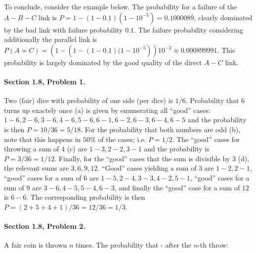 To conclude, consider the example below. The probability for a failure of the $A-B-C$ link is $P = 1 - (1-0.1)(1-10^{-5}) = 0.100008\bar{9}$, clearly dominated by the bad link with failure probability $0.1$. The failure probability considering additionally the parallel link is $P(A \not\sim C) = \left(1 - \left(1 - (1-0.1)(1-10^{-5}\right)\right)10^{-3}\approx 0.000899991$. This probability is largely dominated by the good quality of the direct $A-C$ link.

\vspace{0.5cm}




\paragraph{Section 1.8, Problem 1.} Two (fair) dice with probability of one side (per dice) is $1/6$. Probability that $6$ turns up exactely once (a) is given by enumerating all ``good'' cases: $1-6, 2-6, 3-6, 4-6, 5-6, 6-1, 6-2, 6-3, 6-4, 6-5$ and the probability is then $P = 10/36 = 5/18$. For the probability that both numbers are odd (b), note that this happens in $50\%$ of the cases; i.e. $P = 1/2$. The ``good'' cases for throwing a sum of $4$ (c) are $1-3, 2-2, 3-1$ and the probability is $P = 3/36 = 1/12$. Finally, for the ``good'' cases that the sum is divisible by $3$ (d), the relevant sums are $3,6,9,12$. ``Good'' cases yielding a sum of $3$ are $1-2, 2-1$, ``good'' cases for a sum of $6$ are $1-5, 2-4, 3-3, 4-2, 5-1$, ``good'' cases for a sum of $9$ are $3-6, 4-5, 5-4, 6-3$, and finally the ``good'' case for a sum of $12$ is $6-6$. The corresponding probability is then $P = (2 + 5 + 4 + 1)/36 = 12/36 = 1/3$.

\paragraph{Section 1.8, Problem 2.} A fair coin is thrown $n$ times. The probability that - after the $n$-th throw:

